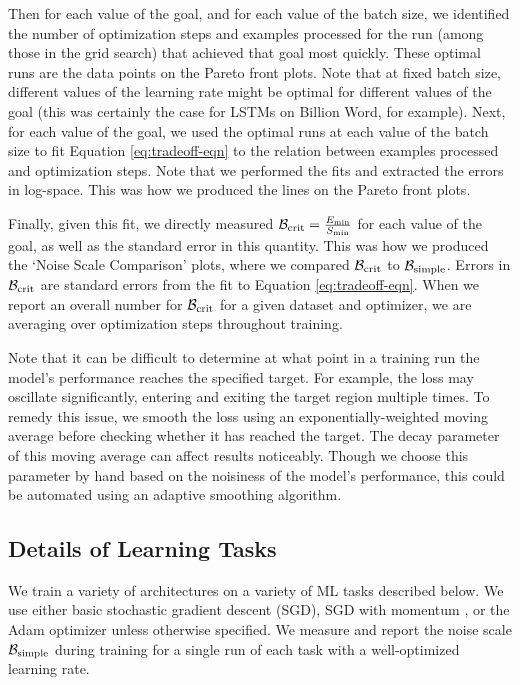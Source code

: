 \documentclass[english]{article}
\newcommand{\CB}{{\cal B}}
\begin{document}
Then for each  value of the goal, and for each value of the batch size, we identified the number of optimization steps and examples processed for the run (among those in the grid search) that achieved that goal most quickly.  These optimal runs are the data points on the Pareto front plots.  Note that at fixed batch size, different values of the learning rate might be optimal for different values of the goal (this was certainly the case for LSTMs on Billion Word, for example).  Next, for each value of the goal, we used the optimal runs at each value of the batch size to  fit Equation \ref{eq:tradeoff-eqn} to the relation between examples processed and optimization steps.  Note that we performed the fits and extracted the errors in log-space. This was how we produced the lines on the Pareto front plots.

Finally, given this fit, we directly measured $\CB_{\rm crit} = \frac{E_{\rm min}}{S_{\rm min}}$ for each value of the goal, as well as the standard error in this quantity.  This was how we produced the `Noise Scale Comparison' plots, where we compared $\CB_{\rm crit}$ to $\CB_{\rm simple}$.  Errors in $\CB_{\rm crit}$ are standard errors from the fit to Equation \ref{eq:tradeoff-eqn}.  When we report an overall number for $\CB_{\rm crit}$ for a given dataset and optimizer, we are averaging over optimization steps throughout training.

Note that it can be difficult to determine at what point in a training run the model's performance reaches the specified target.  For example, the loss may oscillate significantly, entering and exiting the target region multiple times.  To remedy this issue, we smooth the loss using an exponentially-weighted moving average before checking whether it has reached the target.  The decay parameter of this moving average can affect results noticeably. Though we choose this parameter by hand based on the noisiness of the model's performance, this could be automated using an adaptive smoothing algorithm.


\subsection{Details of Learning Tasks \label{sec:task-details}}

We train a variety of architectures on a variety of ML tasks described below. We use either basic stochastic gradient descent (SGD), SGD with momentum \cite{pmlr-v28-sutskever13}, or the Adam optimizer \cite{kingma2014adam} unless otherwise specified.  We measure and report the noise scale $\CB_{\rm simple}$ during training for a single run of each task with a well-optimized learning rate.
\end{document}
